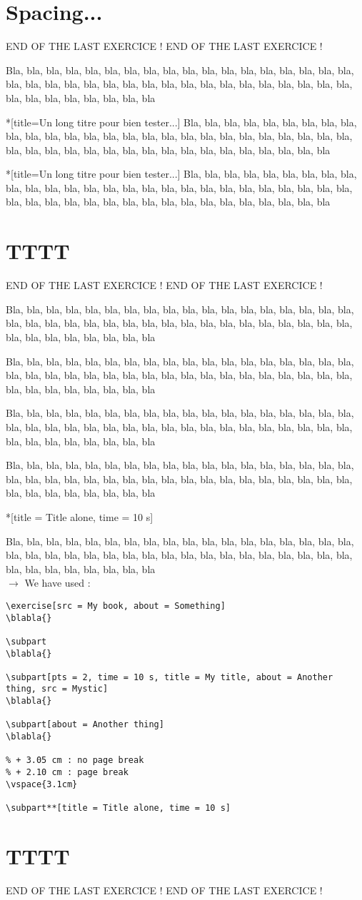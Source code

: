 \documentclass[12pt]{article}
\newcommand\blabla{%
		\noindent Bla, bla, bla, bla, bla, bla, bla, bla, bla, bla, bla,
		bla, bla, bla, bla, bla, bla, bla, bla, bla, bla, bla,
		bla, bla, bla, bla, bla, bla, bla, bla, bla, bla, bla,
		bla, bla, bla, bla, bla, bla, bla, bla, bla, bla, bla
	}
\newcommand\codeused{
		\blabla{} \medskip  \\ \noindent $\rightarrow$ We have used :
	}
\begin{document}
\newpage\section{Spacing...}

\noindent END OF THE LAST EXERCICE ! END OF THE LAST EXERCICE !

\exercise
\blabla{}

\subpart**[title=Un long titre pour bien tester...]
\blabla{}


\exercise

\subpart**[title=Un long titre pour bien tester...]
\blabla{}



\newpage\section{TTTT}

\noindent END OF THE LAST EXERCICE ! END OF THE LAST EXERCICE !

\exercise[src = My book, about = Something]   
\blabla{}

\subpart
\blabla{}

\subpart[pts = 2, time = 10 s, title = My title, about = Another thing, src = Mystic]
\blabla{}

\subpart[about = Another thing]
\blabla{}


\subpart**[title = Title alone, time = 10 s]


\codeused{}

\begin{verbatim}
\exercise[src = My book, about = Something]
\blabla{}

\subpart
\blabla{}

\subpart[pts = 2, time = 10 s, title = My title, about = Another thing, src = Mystic]
\blabla{}

\subpart[about = Another thing]
\blabla{}

% + 3.05 cm : no page break
% + 2.10 cm : page break
\vspace{3.1cm}

\subpart**[title = Title alone, time = 10 s]\end{verbatim}



\newpage\section{TTTT}

\noindent END OF THE LAST EXERCICE ! END OF THE LAST EXERCICE !
\end{document}

